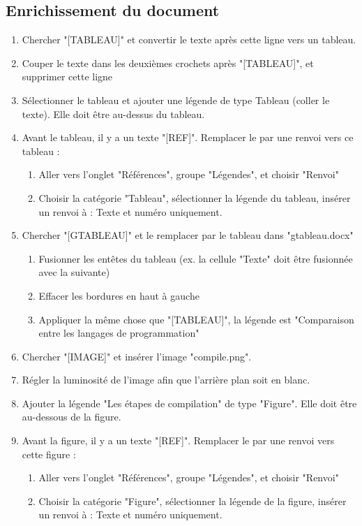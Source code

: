 \documentclass[11pt, a4paper]{article}
\begin{document}
\subsection*{Enrichissement du document}

\begin{enumerate}
	\item Chercher "[TABLEAU]" et convertir le texte après cette ligne vers un tableau. 
	\item Couper le texte dans les deuxièmes crochets après "[TABLEAU]", et supprimer cette ligne
	\item Sélectionner le tableau et ajouter une légende de type Tableau (coller le texte). Elle doit être au-dessus du tableau. 
	\item Avant le tableau, il y a un texte "[REF]". Remplacer le par une renvoi vers ce tableau :
	\begin{enumerate}
		\item Aller vers l'onglet "Références", groupe "Légendes", et choisir "Renvoi"
		\item Choisir la catégorie "Tableau", sélectionner la légende du tableau, insérer un renvoi à : Texte et numéro uniquement.
	\end{enumerate}
	\item Chercher "[GTABLEAU]" et le remplacer par le tableau dans "gtableau.docx"
	\begin{enumerate}
		\item Fusionner les entêtes du tableau (ex. la cellule "Texte" doit être fusionnée avec la suivante)
		\item Effacer les bordures en haut à gauche
		\item Appliquer la même chose que "[TABLEAU]", la légende est "Comparaison entre les langages de programmation"
	\end{enumerate}
	\item Chercher "[IMAGE]" et insérer l'image "compile.png". 
	\item Régler la luminosité de l'image afin que l'arrière plan soit en blanc.
	\item Ajouter la légende "Les étapes de compilation" de type "Figure". Elle doit être au-dessous de la figure. 
	\item Avant la figure, il y a un texte "[REF]". Remplacer le par une renvoi vers cette figure :
	\begin{enumerate}
		\item Aller vers l'onglet "Références", groupe "Légendes", et choisir "Renvoi"
		\item Choisir la catégorie "Figure", sélectionner la légende de la figure, insérer un renvoi à : Texte et numéro uniquement.

\end{enumerate}
\end{enumerate}
\end{document}
